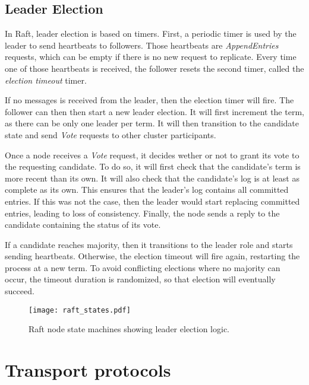 \subsection{Leader Election}

In Raft, leader election is based on timers.
First, a periodic timer is used by the leader to send heartbeats to followers.
Those heartbeats are \emph{AppendEntries} requests, which can be empty if there is no new request to replicate.
Every time one of those heartbeats is received, the follower resets the second timer, called the \emph{election timeout} timer.

If no messages is received from the leader, then the election timer will fire.
The follower can then then start a new leader election.
It will first increment the term, as there can be only one leader per term.
It will then transition to the candidate state and send \emph{Vote} requests to other cluster participants.

Once a node receives a \emph{Vote} request, it decides wether or not to grant its vote to the requesting candidate.
To do so, it will first check that the candidate's term is more recent than its own.
It will also check that the candidate's log is at least as complete as its own.
This ensures that the leader's log contains all committed entries.
If this was not the case, then the leader would start replacing committed entries, leading to loss of consistency.
Finally, the node sends a reply to the candidate containing the status of its vote.

If a candidate reaches majority, then it transitions to the leader role and starts sending heartbeats.
Otherwise, the election timeout will fire again, restarting the process at a new term.
To avoid conflicting elections where no majority can occur, the timeout duration is randomized, so that election will eventually succeed.


\begin{figure}[h]
    \centering
    \texttt{[image: raft\_states.pdf]}
    \caption{Raft node state machines showing leader election logic.
    \label{fig:raft-leader-election}
    }
\end{figure}


\section{Transport protocols}


